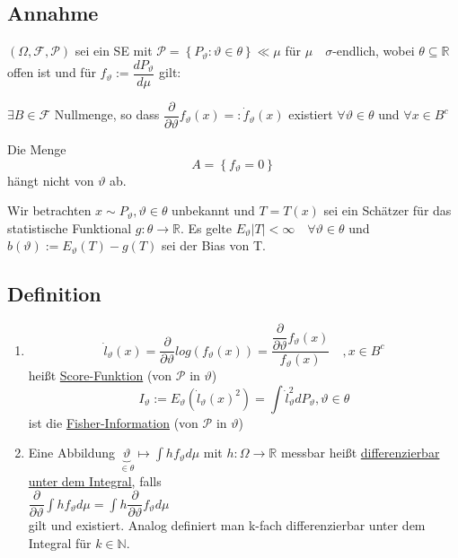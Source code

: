 \documentclass[german,10pt,oneside, fleqn, a4paper]{article}
\newcommand {\R}	{\mathbb{R}}
\newcommand {\N}	{\mathbb{N}}
\newcommand{\ra}{\rightarrow}
\newcommand{\brc}[1]{\left(#1\right)}
\newcommand{\brac}[1]{\left\lbrace #1\right\rbrace}
\newcommand{\mc}[1]{\mathcal{#1}}
\newcommand{\1}[1]{1_{#1}}
\newcommand{\2}[1]{\1{\brac{#1}}}
\newcommand{\rraum}{\brc{\Omega,\mc{F},\mc{P}}}
\newcommand{\f}{\mc{F}}
\newcommand{\p}{\mc{P}}
\newcommand{\qf}{\quad\forall}
\begin{document}
\subsection{Annahme}
\label{13.1}
$\rraum$ sei ein SE mit $\p=\brac{P_\vartheta:\vartheta\in\theta}\ll\mu$ für $\mu\quad \sigma$-endlich, wobei $\theta\subseteq\R$ offen ist und für $f_\vartheta:=\dfrac{dP_\vartheta}{d\mu}$ gilt:\begin{list}{•}{}
\item $\exists B\in\f$ Nullmenge, so dass $\dfrac{\partial}{\partial\vartheta}f_\vartheta(x)=:\dot f_\vartheta(x)$ existiert $\forall\vartheta\in\theta$ und $\forall x\in B^c$
\item Die Menge \[A=\brac{f_\vartheta=0}\]
hängt nicht von $\vartheta$ ab.
\end{list}
Wir betrachten $x\sim P_\vartheta, \vartheta\in\theta$ unbekannt und $T=T(x)$ sei ein Schätzer für das statistische Funktional $g:\theta\ra\R$. Es gelte $E_\vartheta|T|<\infty\qf\vartheta\in\theta$ und $b(\vartheta):=E_\vartheta(T)-g(T)$ sei der Bias von T.

\subsection{Definition}
\label{13.2}
\begin{enumerate}[label=(\alph*)]
\item \[\dot l_\vartheta(x)=\dfrac{\partial}{\partial\vartheta}log(f_\vartheta(x))=\dfrac{\dfrac{\partial}{\partial\vartheta}f_\vartheta(x)}{f_\vartheta(x)}\quad ,x\in B^c\]
heißt \underline{Score-Funktion} (von $\p$ in $\vartheta$)\[I_\vartheta:=E_\vartheta(\dot l_\vartheta(x)^2)=\int\dot l_\vartheta^2dP_\vartheta, \vartheta\in\theta\]
ist die \underline{Fisher-Information} (von $\p$ in $\vartheta$)
\item Eine Abbildung $\underbrace{\vartheta}_{\in\theta}\mapsto\int hf_\vartheta d\mu$ mit $h:\Omega\ra\R$ messbar heißt \underline{differenzierbar unter dem Integral}, falls \\
$\dfrac{\partial}{\partial\vartheta}\int hf_\vartheta d\mu=\int h\dfrac{\partial}{\partial\vartheta}f_\vartheta d\mu$\\
gilt und existiert.
Analog definiert man k-fach differenzierbar unter dem Integral für $k\in\N$.
\end{enumerate}
\end{document}
